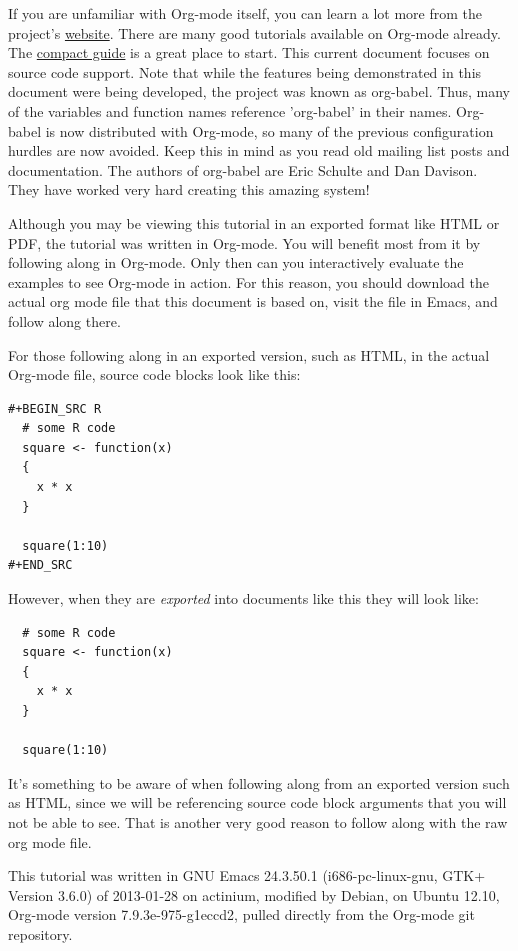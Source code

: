 \documentclass[11pt]{article}
\begin{document}
If you are unfamiliar with Org-mode itself, you can learn a lot more from the project's \href{http://orgmode.org}{website}. There are many good tutorials available on Org-mode already. The \href{http://orgmode.org/guide/index.html}{compact guide} is a great place to start. This current document focuses on source code support. Note that while the features being demonstrated in this document were being developed, the project was known as org-babel. Thus, many of the variables and function names reference 'org-babel' in their names. Org-babel is now distributed with Org-mode, so many of the previous configuration hurdles are now avoided. Keep this in mind as you read old mailing list posts and documentation. The authors of org-babel are Eric Schulte and Dan Davison. They have worked very hard creating this amazing system!

Although you may be viewing this tutorial in an exported format like HTML or PDF, the tutorial was written in Org-mode. You will benefit most from it by following along in Org-mode. Only then can you interactively evaluate the examples to see Org-mode in action. For this reason, you should download the actual org mode file that this document is based on, visit the file in Emacs, and follow along there.

For those following along in an exported version, such as HTML,  in the actual Org-mode file, source code blocks look like this: 

\begin{verbatim}
#+BEGIN_SRC R 
  # some R code 
  square <- function(x) 
  {
    x * x
  }
    
  square(1:10)
#+END_SRC
\end{verbatim}

However, when they are \emph{exported} into documents like this they will look like:

\begin{verbatim}
  # some R code 
  square <- function(x) 
  {
    x * x
  }
    
  square(1:10)
\end{verbatim}

It's something to be aware of when following along from an exported version such as HTML, since we will be referencing source code block arguments that you will not be able to see.  That is another very good reason to follow along with the raw org mode file.

This tutorial was written in GNU Emacs 24.3.50.1 (i686-pc-linux-gnu, GTK+ Version 3.6.0) of 2013-01-28 on actinium, modified by Debian, on Ubuntu 12.10, Org-mode version 7.9.3e-975-g1eccd2, pulled directly from the Org-mode git repository.
\end{document}
